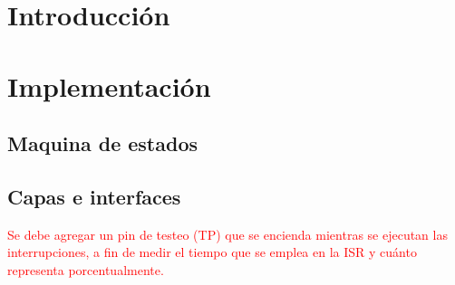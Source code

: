 




%


\tableofcontents
\newpage


\section{Introducción}
	\label{intro}
	

\section{Implementación}
	\subsection{Maquina de estados}
	\label{imp}
	
	
	\subsection{Capas e interfaces}
	\label{drivers}
	

%	

%	


\begin{center}
\textcolor{red}{\LARGE{Se debe agregar un pin de testeo (TP) que se encienda mientras se ejecutan las interrupciones, a fin de medir el tiempo que se emplea en la ISR y cuánto representa porcentualmente.}}
\end{center}


